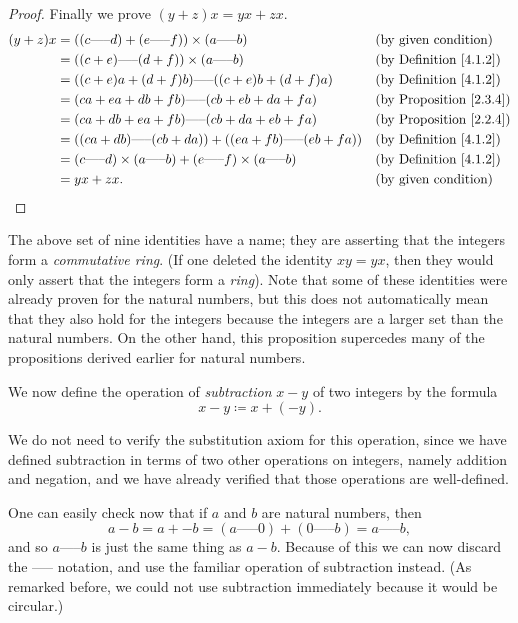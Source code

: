\begin{proof}
Finally we prove \((y + z)x = yx + zx\).
\begin{align*}
(y + z)x &= ((c \text{-----} d) + (e \text{-----} f)) \times (a \text{-----} b) && \text{(by given condition)} \\
&= ((c + e) \text{-----} (d + f)) \times (a \text{-----} b) && \text{(by Definition \ref{4.1.2})} \\
&= ((c + e)a + (d + f)b) \text{-----} ((c + e)b + (d + f)a) && \text{(by Definition \ref{4.1.2})} \\
&= (ca + ea + db + fb) \text{-----} (cb + eb + da + fa) && \text{(by Proposition \ref{2.3.4})} \\
&= (ca + db + ea + fb) \text{-----} (cb + da + eb + fa) && \text{(by Proposition \ref{2.2.4})} \\
&= ((ca + db) \text{-----} (cb + da)) + ((ea + fb) \text{-----} (eb + fa)) && \text{(by Definition \ref{4.1.2})} \\
&= (c \text{-----} d) \times (a \text{-----} b) + (e \text{-----} f) \times (a \text{-----} b) && \text{(by Definition \ref{4.1.2})} \\
&= yx + zx. && \text{(by given condition)}
\end{align*}
\end{proof}

\begin{remark}\label{4.1.7}
The above set of nine identities have a name; they are asserting that the integers form a \emph{commutative ring}.
(If one deleted the identity \(xy = yx\), then they would only assert that the integers form a \emph{ring}).
Note that some of these identities were already proven for the natural numbers, but this does not automatically mean that they also hold for the integers because the integers are a larger set than the natural numbers.
On the other hand, this proposition supercedes many of the propositions derived earlier for natural numbers.
\end{remark}

We now define the operation of \emph{subtraction} \(x - y\) of two integers by the formula
\[
    x - y \coloneqq x + (-y).
\]

We do not need to verify the substitution axiom for this operation, since we have defined subtraction in terms of two other operations on integers, namely addition and negation, and we have already verified that those operations are well-defined.

One can easily check now that if \(a\) and \(b\) are natural numbers, then
\[
    a - b = a + -b = (a \text{-----} 0) + (0 \text{-----} b) = a \text{-----} b,
\]
and so \(a \text{-----} b\) is just the same thing as \(a - b\).
Because of this we can now discard the ----- notation, and use the familiar operation of subtraction instead.
(As remarked before, we could not use subtraction immediately because it would be circular.)

